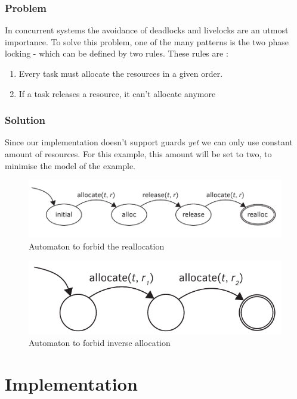 			\subsubsection{Problem}
				In concurrent systems the avoidance of deadlocks and livelocks are an utmost importance.
				To solve this problem, one of the many patterns is  the two phase locking - which can be defined by two rules.
				These rules are : 
				\begin{enumerate}
					\item{Every task must allocate the resources in a given order.}
					\item{If a task releases a resource, it can't allocate anymore}
				\end{enumerate}
			\subsubsection{Solution}
				Since our implementation doesn't support guards \emph{yet} we can only use constant amount of resources.
				For this example, this amount will be set to two, to minimise the model of the example.

				\begin{figure}[h]
				\centering
				\includegraphics[width=0.7\linewidth]{include/figures/chapter_5/mars_example_aut1}
				\caption{Automaton to forbid the reallocation}
				\label{fig:cep:marsautomaton1}
				\end{figure}		
				
				
				\begin{figure}[h]
				\centering
				\includegraphics[width=0.7\linewidth]{include/figures/chapter_5/mars_example_aut2}
				\caption{Automaton to forbid inverse allocation}
				\label{fig:cep:marsautomaton2}
				\end{figure}	

				
				
	\section{Implementation}
